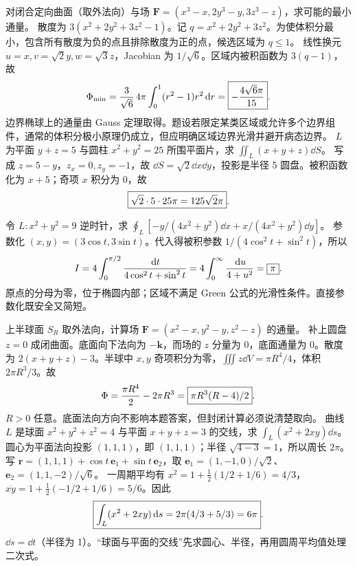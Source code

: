 对闭合定向曲面（取外法向）与场 $\bm F=(x^3-x,2y^3-y,3z^3-z)$，求可能的最小通量。
\sol 散度为 $3(x^2+2y^2+3z^2-1)$。记 $q=x^2+2y^2+3z^2$。为使体积分最小，包含所有散度为负的点且排除散度为正的点，候选区域为 $q\le1$。
线性换元 $u=x,v=\sqrt2y,w=\sqrt3z$，Jacobian 为 $1/\sqrt6$。区域内被积函数为 $3(q-1)$，故
\[
\Phi_{\min}=\frac3{\sqrt6}\,4\pi\int_0^1(r^2-1)r^2\,\mathrm d r
=\boxed{-\frac{4\sqrt6\pi}{15}}.
\]
边界椭球上的通量由 Gauss 定理取得。题设若限定某类区域或允许多个边界组件，通常的体积分极小原理仍成立，但应明确区域边界光滑并避开病态边界。
$L$ 为平面 $y+z=5$ 与圆柱 $x^2+y^2=25$ 所围平面片，求 $\iint_L(x+y+z)\dd S$。
\sol 写成 $z=5-y$，$z_x=0,z_y=-1$，故 $\dd S=\sqrt2\dd x\dd y$，投影是半径 5 圆盘。被积函数化为 $x+5$；奇项 $x$ 积分为 0，故
\[\boxed{\sqrt2\cdot5\cdot25\pi=125\sqrt2\pi}.\]

令 $L:x^2+y^2=9$ 逆时针，求
$\oint_L[-y/(4x^2+y^2)\dd x+x/(4x^2+y^2)\dd y]$。
\sol 参数化 $(x,y)=(3\cos t,3\sin t)$。代入得被积参数 $1/(4\cos^2t+\sin^2t)$，所以
\[
I=4\int_0^{\pi/2}\frac{\,\mathrm d t}{4\cos^2t+\sin^2t}
=4\int_0^\infty\frac{\,\mathrm d u}{4+u^2}=\boxed{\pi}.
\]
原点的分母为零，位于椭圆内部；区域不满足 Green 公式的光滑性条件。直接参数化既安全又简短。

上半球面 $S_R$ 取外法向，计算场 $\bm F=(x^2-x,y^2-y,z^2-z)$ 的通量。
\sol 补上圆盘 $z=0$ 成闭曲面。底面向下法向为 $-\bm k$，而场的 $z$ 分量为 0，底面通量为 0。散度为 $2(x+y+z)-3$。半球中 $x,y$ 奇项积分为零，$\iiint z\dd V=\pi R^4/4$，体积 $2\pi R^3/3$。故
\[
\Phi=\frac{\pi R^4}2-2\pi R^3=\boxed{\pi R^3(R-4)/2}.
\]
$R>0$ 任意。底面法向方向不影响本题答案，但封闭计算必须说清楚取向。
曲线 $L$ 是球面 $x^2+y^2+z^2=4$ 与平面 $x+y+z=3$ 的交线，求 $\int_L(x^2+2xy)\dd s$。
\sol 圆心为平面法向投影 $(1,1,1)$，即 $(1,1,1)$；半径 $\sqrt{4-3}=1$，所以周长 $2\pi$。写 $\bm r=(1,1,1)+\cos t\,\bm e_1+\sin t\,\bm e_2$，取
$\bm e_1=(1,-1,0)/\sqrt2$、$\bm e_2=(1,1,-2)/\sqrt6$。
一周期平均有 $\overline{x^2}=1+\frac12(1/2+1/6)=4/3$，$\overline{xy}=1+\frac12(-1/2+1/6)=5/6$。因此
\[\boxed{\int_L(x^2+2xy)\,\mathrm d s=2\pi(4/3+5/3)=6\pi}.\]
$\dd s=\dd t$（半径为 1）。“球面与平面的交线”先求圆心、半径，再用圆周平均值处理二次式。

